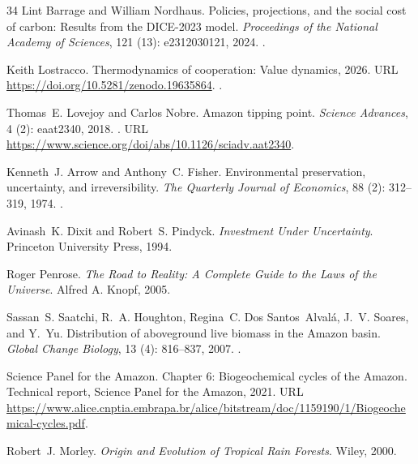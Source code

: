 \documentclass[11pt]{article}
\theoremstyle{plain}
\theoremstyle{definition}
\theoremstyle{remark}
\begin{document}
\begin{thebibliography}{34}
Lint Barrage and William Nordhaus.
\newblock Policies, projections, and the social cost of carbon: Results from
  the {DICE-2023} model.
\newblock \emph{Proceedings of the National Academy of Sciences}, 121
  (13): e2312030121, 2024.
\newblock {}.

Keith Lostracco.
\newblock Thermodynamics of cooperation: Value dynamics, 2026{}.
\newblock URL \url{https://doi.org/10.5281/zenodo.19635864}.
\newblock {}.

Thomas~E. Lovejoy and Carlos Nobre.
\newblock Amazon tipping point.
\newblock \emph{Science Advances}, 4 (2): eaat2340, 2018.
\newblock {}.
\newblock URL \url{https://www.science.org/doi/abs/10.1126/sciadv.aat2340}.

Kenneth~J. Arrow and Anthony~C. Fisher.
\newblock Environmental preservation, uncertainty, and irreversibility.
\newblock \emph{The Quarterly Journal of Economics}, 88 (2):
  312--319, 1974.
\newblock {}.

Avinash~K. Dixit and Robert~S. Pindyck.
\newblock \emph{Investment Under Uncertainty}.
\newblock Princeton University Press, 1994.

Roger Penrose.
\newblock \emph{The Road to Reality: A Complete Guide to the Laws of the
  Universe}.
\newblock Alfred A. Knopf, 2005.

Sassan~S. Saatchi, R.~A. Houghton, Regina~C. Dos Santos~Alval{\'a}, J.~V.
  Soares, and Y.~Yu.
\newblock Distribution of aboveground live biomass in the {Amazon} basin.
\newblock \emph{Global Change Biology}, 13 (4): 816--837,
  2007.
\newblock {}.

{Science Panel for the Amazon}.
\newblock Chapter 6: Biogeochemical cycles of the {Amazon}.
\newblock Technical report, Science Panel for the Amazon, 2021.
\newblock URL
  \url{https://www.alice.cnptia.embrapa.br/alice/bitstream/doc/1159190/1/Biogeochemical-cycles.pdf}.

Robert~J. Morley.
\newblock \emph{Origin and Evolution of Tropical Rain Forests}.
\newblock Wiley, 2000.

\end{thebibliography}
\end{document}
